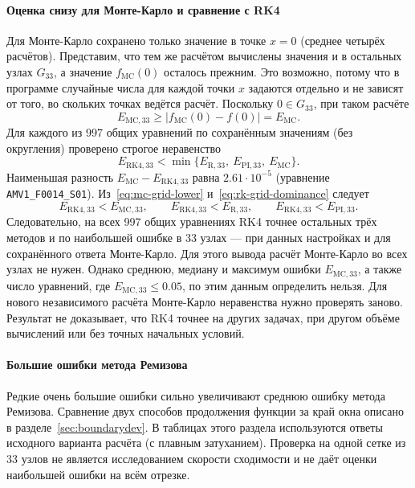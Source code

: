 \documentclass[14pt,a4paper]{extarticle}
\begin{document}
\paragraph{Оценка снизу для Монте-Карло и сравнение с RK4\\}
Для Монте-Карло сохранено только значение в точке $x=0$ (среднее
четырёх расчётов). Представим, что тем же расчётом вычислены значения
и в остальных узлах $G_{33}$, а значение $f_{\mathrm{MC}}(0)$ осталось
прежним. Это возможно, потому что в программе случайные числа для
каждой точки $x$ задаются отдельно и не зависят от того, во скольких
точках ведётся расчёт. Поскольку $0\in G_{33}$, при таком расчёте
\begin{equation}\label{eq:mc-grid-lower}
E_{\mathrm{MC},33}\ge
|f_{\mathrm{MC}}(0)-f(0)|=E_{\mathrm{MC}}.
\end{equation}
Для каждого из 997 общих уравнений по сохранённым значениям (без
округления) проверено строгое неравенство
\begin{equation}\label{eq:rk-grid-dominance}
E_{\mathrm{RK4},33}<
\min\{E_{\mathrm{R},33},\ E_{\mathrm{PI},33},\ E_{\mathrm{MC}}\}.
\end{equation}
Наименьшая разность $E_{\mathrm{MC}}-E_{\mathrm{RK4},33}$ равна
$2.61\cdot10^{-5}$ (уравнение \texttt{AMV1\_F0014\_S01}).
Из~\eqref{eq:mc-grid-lower} и~\eqref{eq:rk-grid-dominance} следует
\[
E_{\mathrm{RK4},33}<E_{\mathrm{MC},33},\qquad
E_{\mathrm{RK4},33}<E_{\mathrm{R},33},\qquad
E_{\mathrm{RK4},33}<E_{\mathrm{PI},33}.
\]
Следовательно, на всех 997 общих уравнениях RK4 точнее остальных трёх
методов и по наибольшей ошибке в 33 узлах --- при данных настройках
и для сохранённого ответа Монте-Карло. Для этого вывода расчёт
Монте-Карло во всех узлах не нужен. Однако среднюю, медиану и максимум
ошибки $E_{\mathrm{MC},33}$, а также число уравнений, где
$E_{\mathrm{MC},33}\le0.05$, по этим данным определить нельзя.
Для нового независимого расчёта Монте-Карло неравенства нужно
проверять заново. Результат не доказывает, что RK4 точнее на других
задачах, при другом объёме вычислений или без точных начальных условий.

\paragraph{Большие ошибки метода Ремизова\\}
Редкие очень большие ошибки сильно увеличивают среднюю ошибку метода
Ремизова. Сравнение двух способов продолжения функции за край окна
описано в разделе~\ref{sec:boundarydev}. В таблицах этого раздела
используются ответы исходного варианта расчёта (с плавным затуханием).
Проверка на одной сетке из 33 узлов не является исследованием скорости
сходимости и не даёт оценки наибольшей ошибки на всём отрезке.
\end{document}
